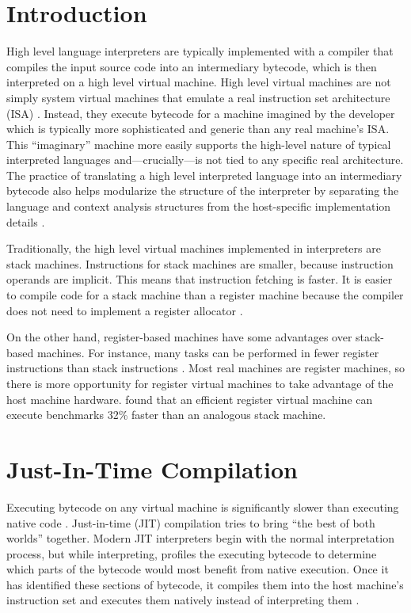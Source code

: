 \documentclass[A4]{sig-alternate}
\begin{document}



\section{Introduction}

High level language interpreters are typically implemented with a compiler that compiles the input source code into an intermediary bytecode, which is then interpreted on a high level virtual machine. High level virtual machines are not simply system virtual machines that emulate a real instruction set architecture (ISA) \citep{smithvmarticle}. Instead, they execute bytecode for a machine imagined by the developer which is typically more sophisticated and generic than any real machine's ISA. This ``imaginary'' machine more easily supports the high-level nature of typical interpreted languages and---crucially---is not tied to any specific real architecture. The practice of translating a high level interpreted language into an intermediary bytecode also helps modularize the structure of the interpreter by separating the language and context analysis structures from the host-specific implementation details \citep{structureinterpreters}.

Traditionally, the high level virtual machines implemented in interpreters are stack machines. Instructions for stack machines are smaller, because instruction operands are implicit. This means that instruction fetching is faster. It is easier to compile code for a stack machine than a register machine because the compiler does not need to implement a register allocator \citep{caseregistervm}.

On the other hand, register-based machines have some advantages over stack-based machines. For instance, many tasks can be performed in fewer register instructions than stack instructions \citep{caseregistervm}. Most real machines are register machines, so there is more opportunity for register virtual machines to take advantage of the host machine hardware. \citet{stackregistershowdown} found that an efficient register virtual machine can execute benchmarks 32\% faster than an analogous stack machine.

\section{Just-In-Time Compilation}
Executing bytecode on any virtual machine is significantly slower than executing native code \citep{optimizingindirectbranch}. Just-in-time (JIT) compilation tries to bring ``the best of both worlds'' together. Modern JIT interpreters begin with the normal interpretation process, but while interpreting, profiles the executing bytecode to determine which parts of the bytecode would most benefit from native execution. Once it has identified these sections of bytecode, it compiles them into the host machine's instruction set and executes them natively instead of interpreting them \citep{historyjit}.
\end{document}
